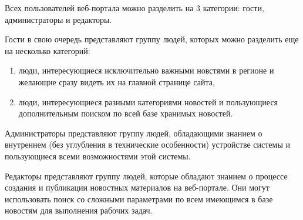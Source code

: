 Всех пользователей веб-портала можно разделить на 3 категории: гости, администраторы и редакторы.

Гости в свою очередь представляют группу людей, которых можно разделить еще на несколько категорий: \begin{enumerate}
    \item люди, интересующиеся исключительно важными новстями в регионе и желающие сразу видеть их на главной странице сайта,
    \item люди, интересующиеся разными категориями новостей и пользующиеся дополнительным поиском по всей базе хранимых новостей.   
\end{enumerate}

Администраторы представляют группу людей, обладающими знанием о внутреннем (без углубления в технические особенности) устройстве системы и пользующиеся всеми возможностями этой системы.

Редакторы представляют группу людей, которые обладают знанием о процессе создания и публикации новостных материалов на веб-портале. Они могут использовать поиск со сложными параметрами по всем имеющимся в базе новостям для выполнения рабочих задач.

